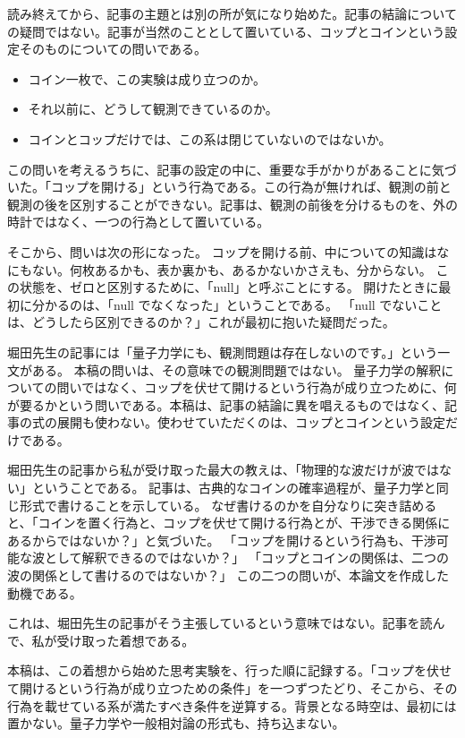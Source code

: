 \documentclass[
  a4paper,
]{ltjsarticle}
\providecommand{\tightlist}{%
  \setlength{\itemsep}{0pt}\setlength{\parskip}{0pt}}
\begin{document}
読み終えてから、記事の主題とは別の所が気になり始めた。記事の結論についての疑問ではない。記事が当然のこととして置いている、コップとコインという設定そのものについての問いである。

\begin{itemize}
\tightlist
\item
  コイン一枚で、この実験は成り立つのか。
\item
  それ以前に、どうして観測できているのか。
\item
  コインとコップだけでは、この系は閉じていないのではないか。
\end{itemize}

この問いを考えるうちに、記事の設定の中に、重要な手がかりがあることに気づいた。「コップを開ける」という行為である。この行為が無ければ、観測の前と観測の後を区別することができない。記事は、観測の前後を分けるものを、外の時計ではなく、一つの行為として置いている。

そこから、問いは次の形になった。
コップを開ける前、中についての知識はなにもない。何枚あるかも、表か裏かも、あるかないかさえも、分からない。
この状態を、ゼロと区別するために、「null」と呼ぶことにする。
開けたときに最初に分かるのは、「null でなくなった」ということである。
「null
でないことは、どうしたら区別できるのか？」これが最初に抱いた疑問だった。

堀田先生の記事には「量子力学にも、観測問題は存在しないのです。」という一文がある。
本稿の問いは、その意味での観測問題ではない。
量子力学の解釈についての問いではなく、コップを伏せて開けるという行為が成り立つために、何が要るかという問いである。本稿は、記事の結論に異を唱えるものではなく、記事の式の展開も使わない。使わせていただくのは、コップとコインという設定だけである。

堀田先生の記事から私が受け取った最大の教えは、「物理的な波だけが波ではない」ということである。
記事は、古典的なコインの確率過程が、量子力学と同じ形式で書けることを示している。
なぜ書けるのかを自分なりに突き詰めると、「コインを置く行為と、コップを伏せて開ける行為とが、干渉できる関係にあるからではないか？」と気づいた。
「コップを開けるという行為も、干渉可能な波として解釈できるのではないか？」
「コップとコインの関係は、二つの波の関係として書けるのではないか？」
この二つの問いが、本論文を作成した動機である。

これは、堀田先生の記事がそう主張しているという意味ではない。記事を読んで、私が受け取った着想である。

本稿は、この着想から始めた思考実験を、行った順に記録する。「コップを伏せて開けるという行為が成り立つための条件」を一つずつたどり、そこから、その行為を載せている系が満たすべき条件を逆算する。背景となる時空は、最初には置かない。量子力学や一般相対論の形式も、持ち込まない。
\end{document}
